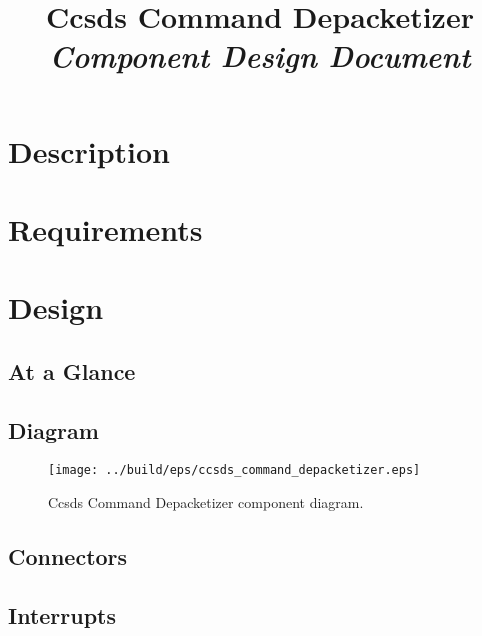 



\title{\textbf{Ccsds Command Depacketizer} \\
\large\textit{Component Design Document}}
\date{}
\maketitle

\section{Description}


\section{Requirements}


\section{Design}

\subsection{At a Glance}


\subsection{Diagram}
\begin{figure}[H]
  \texttt{[image: ../build/eps/ccsds\_command\_depacketizer.eps]}
  \caption{Ccsds Command Depacketizer component diagram.}
\end{figure}

\subsection{Connectors}


\subsection{Interrupts}



